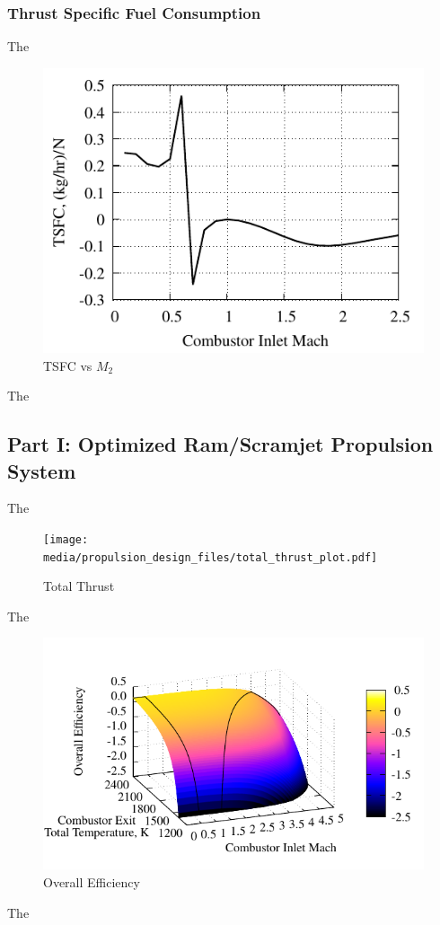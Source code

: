 \documentclass[conf]{new-aiaa} %
\begin{document}
\subsubsection{Thrust Specific Fuel Consumption}
The

\begin{figure}[hbt!] %
    \centering
    \includegraphics[]{media/performance_parameter_files/part_h_TSFC.pdf}
    \caption{\label{fig:parthtsfc}TSFC vs \texorpdfstring{\textit{$M_2$}}{M2}}
\end{figure}
The

\subsection{Part I: Optimized Ram/Scramjet Propulsion System}
The

\begin{figure}[hbt!] %
    \centering
    \texttt{[image: media/propulsion\_design\_files/total\_thrust\_plot.pdf]}
    \caption{\label{fig:partithrust}Total Thrust}
\end{figure}
The

\begin{figure}[hbt!] %
    \centering
    \includegraphics[]{media/propulsion_design_files/eta_o_plot.pdf}
    \caption{\label{fig:partietao}Overall Efficiency}
\end{figure}
The
\end{document}
